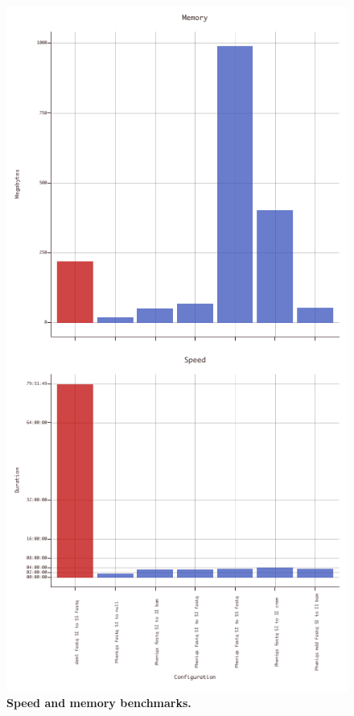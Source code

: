 \documentclass[10pt,twocolumn]{article}
\begin{document}
\begin{figure}[htbp]
\centering
\includegraphics[keepaspectratio,scale=1]{../plot/15_speed_memory}
\caption{\footnotesize{\textbf{Speed and memory benchmarks. } } }
\label{fig:15}
\end{figure}
\end{document}
